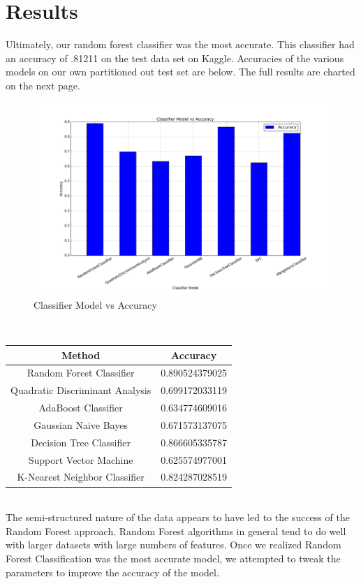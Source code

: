 \documentclass{article}
\begin{document}
\section{Results}
Ultimately, our random forest classifier was the most accurate.  This classifier had an accuracy of .81211 on the test data set on Kaggle. Accuracies of the various models on our own partitioned out test set are below. The full results are charted on the next  page. 
\begin{figure}[h]
\centering
\includegraphics[width=1.0\textwidth]{classifier_selection.png}
\caption{Classifier Model vs Accuracy}
\label{classifier_selection}
\end{figure}\\
\begin{table}[ht]
\centering 
\begin{tabular}{c c } 
\hline 
Method & Accuracy\\ [0.5ex] 
\hline 
Random Forest Classifier & 0.890524379025 \\ 
Quadratic Discriminant Analysis & 0.699172033119\\
AdaBoost Classifier & 0.634774609016\\
Gaussian Naive Bayes & 0.671573137075\\
Decision Tree Classifier & 0.866605335787\\
Support Vector Machine & 0.625574977001\\
K-Nearest Neighbor Classifier & 0.824287028519\\ [1ex] 
\hline 
\end{tabular}
\label{table:nonlin} 
\end{table}\\
The semi-structured nature of the data appears to have led to the success of the Random Forest approach. Random Forest algorithms in general tend to do well with larger datasets with large numbers of features. Once we realized Random Forest Classification was the most accurate model, we attempted to tweak the parameters to improve the accuracy of the model. 
\end{document}
